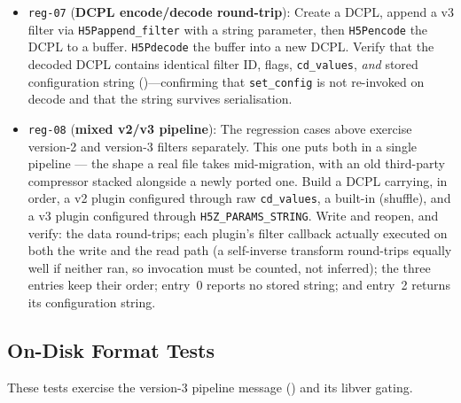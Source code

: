 \documentclass[../RFC-HDFG-2026-001.tex]{subfiles}
\begin{document}
\begin{itemize}
  produced, as it would for an \texttt{H5Pset\_filter}-written dataset.
  (Readability by pre-v3 \emph{libraries} is covered by \texttt{fmt-04},
  .)
\item \texttt{reg-07} (\textbf{DCPL encode/decode round-trip}): Create a DCPL, append a
  v3 filter via \texttt{H5Pappend\_filter} with a string parameter, then
  \texttt{H5Pencode} the DCPL to a buffer.  \texttt{H5Pdecode} the buffer into a new
  DCPL.  Verify that the decoded DCPL contains identical filter ID, flags,
  \texttt{cd\_values}, \emph{and} stored configuration string
  ()---confirming that \texttt{set\_config} is
  not re-invoked on decode and that the string survives serialisation.
\item \texttt{reg-08} (\textbf{mixed v2/v3 pipeline}): The regression cases
  above exercise version-2 and version-3 filters separately.  This one puts
  both in a single pipeline --- the shape a real file takes mid-migration,
  with an old third-party compressor stacked alongside a newly ported one.
  Build a DCPL carrying, in order, a v2 plugin configured through raw
  \texttt{cd\_values}, a built-in (shuffle), and a v3 plugin configured
  through \texttt{H5Z\_PARAMS\_STRING}.  Write and reopen, and verify: the
  data round-trips; each plugin's filter callback actually executed on both
  the write and the read path (a self-inverse transform round-trips equally
  well if neither ran, so invocation must be counted, not inferred); the
  three entries keep their order; entry~0 reports no stored string; and
  entry~2 returns its configuration string.
\end{itemize}


\subsection{On-Disk Format Tests}
\label{sec:test-ondisk}

These tests exercise the version-3 pipeline message
() and its libver gating.
\end{document}
